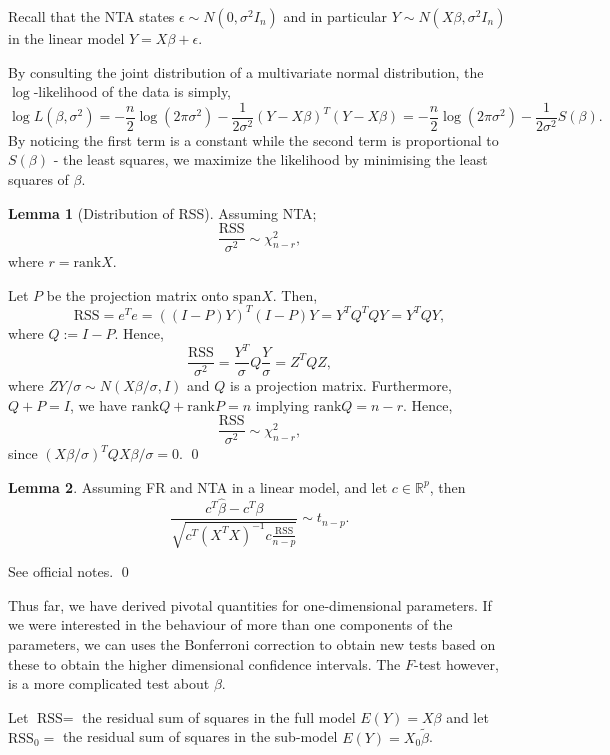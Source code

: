 \documentclass[
]{article}
\theoremstyle{definition}
\theoremstyle{definition}
\newtheorem{lemma}{Lemma}[section]
\begin{document}
Recall that the NTA states \(\epsilon \sim N(0, \sigma^2 I_n)\) and in
particular \(Y \sim N(X\beta, \sigma^2 I_n)\) in the linear model
\(Y = X\beta + \epsilon\).

By consulting the joint distribution of a multivariate normal
distribution, the \(\log\)-likelihood of the data is simply,
\[\log L(\beta, \sigma^2) = -\frac{n}{2} \log(2\pi \sigma^2) 
  - \frac{1}{2\sigma^2}(Y - X\beta)^T(Y - X\beta) = 
  -\frac{n}{2} \log(2\pi \sigma^2) - \frac{1}{2\sigma^2} S(\beta).\] By
noticing the first term is a constant while the second term is
proportional to \(S(\beta)\) - the least squares, we maximize the
likelihood by minimising the least squares of \(\beta\).

\begin{lemma}[Distribution of RSS]
  Assuming NTA; 
  \[\frac{\text{RSS}}{\sigma^2} \sim \chi_{n - r}^2,\]
  where \(r = \text{rank} X\).
\end{lemma}
\proof

Let \(P\) be the projection matrix onto \(\text{span}X\). Then,
\[\text{RSS} = e^T e = ((I - P) Y)^T(I - P)Y = Y^T Q^T Q Y = Y^T Q Y,\]
where \(Q := I - P\). Hence,
\[\frac{\text{RSS}}{\sigma^2} = \frac{Y^T}{\sigma} Q \frac{Y}{\sigma} = Z^T Q Z,\]
where \(ZY / \sigma \sim N(X\beta / \sigma, I)\) and \(Q\) is a
projection matrix. Furthermore, \(Q + P = I\), we have
\(\text{rank} Q + \text{rank} P = n\) implying
\(\text{rank} Q = n - r\). Hence,
\[\frac{\text{RSS}}{\sigma^2} \sim \chi_{n - r}^2,\] since
\((X\beta / \sigma)^T QX \beta / \sigma = 0\). \qed

\begin{lemma}
  Assuming FR and NTA in a linear model, and let \(c \in \mathbb{R}^p\), then 
  \[\frac{c^T \hat \beta - c^T \beta}{\sqrt{c^T (X^T X)^{-1} c \frac{\text{RSS}}{n - p}}} \sim t_{n - p}.\]
\end{lemma}
\proof

See official notes. \qed

Thus far, we have derived pivotal quantities for one-dimensional
parameters. If we were interested in the behaviour of more than one
components of the parameters, we can uses the Bonferroni correction to
obtain new tests based on these to obtain the higher dimensional
confidence intervals. The \(F\)-test however, is a more complicated test
about \(\beta\).

Let \(\text{RSS} =\) the residual sum of squares in the full model
\(E(Y) = X \beta\) and let \(\text{RSS}_0 =\) the residual sum of
squares in the sub-model \(E(Y) = X_0 \tilde \beta\).
\end{document}
